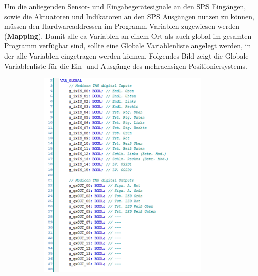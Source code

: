 \documentclass[../../../Bachelorarbeit.tex]{subfiles}
\begin{document}
Um die anliegenden Sensor- und Eingabegerätesignale an den SPS Eingängen, sowie die Aktuatoren und Indikatoren an den SPS Ausgängen nutzen zu können, müssen den Hardwareaddressen im Programm Variablen zugewiesen werden (\eng \textbf{Mapping}). Damit alle \acs{ea}-Variablen an einem Ort als auch global im gesamten Programm verfügbar sind, sollte eine Globale Variablenliste angelegt werden, in der alle Variablen eingetragen werden können. Folgendes Bild zeigt die Globale Variablenliste für die Ein- und Ausgänge des mehrachsigen Positioniersystems.\\

\begin{figure}[H]
    \centering
    \begin{subfigure}[c]{0.42\textwidth}
        \centering
        \includegraphics[width=0.9\textwidth]{Images/GVL1.png}
    \end{subfigure}
    \begin{subfigure}[c]{0.42\textwidth}
        \centering

\end{subfigure}
\end{figure}
\end{document}
